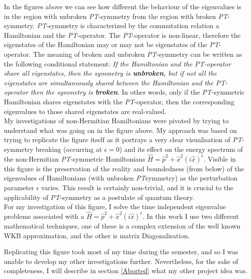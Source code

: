 \documentclass[10pt, a4paper, singlespacing]{report}
\newcommand\PT{\emph{PT}}
\begin{document}
In the figures above we can see how different the behaviour of the eigenvalues is in the region with unbroken \PT-symmetry from the region with broken \PT-symmetry.
\PT-symmetry is characterized by the commutation relation a Hamiltonian and the \PT-operator. The \PT-operator is non-linear, therefore the eigenstates of the Hamiltonian may or may not be eigenstates of the \PT-operator. The meaning of broken and unbroken \PT-symmetry can be written as the following conditional statement: \emph{If the Hamiltonian and the \PT-operator share all eigenstates, then the symmetry is \textbf{unbroken}, but if not all the eigenstates are simultaneously shared between the Hamiltonian and the \PT-operator then the symmetry is \textbf{broken}}\cite{BenderPT}\cite{Bender}. In other words, only if the \PT-symmetric Hamiltonian shares eigenstates with the \PT-operator, then the corresponding eigenvalues to those shared eigenstates are real-valued.\\
My investigations of non-Hermitian Hamiltonians were pivoted by trying to understand what was going on in the figure above. My approach was based on trying to replicate the figure itself as it portrays a very clear visualisation of \PT-symmetry breaking (occurring at $\epsilon = 0$) and its effect on the energy spectrum of the non-Hermitian \PT-symmetric Hamiltonians $\hat{H} = \hat{p}^2 + \hat{x}^2 (i \hat{x})^{\epsilon}$. Visible in this figure is the preservation of the reality and boundedness (from below) of the eigenvalues of Hamiltonians (with unbroken \PT symmetry) as the perturbation parameter $\epsilon$ varies. This result is certainly non-trivial, and it is crucial to the applicability of \PT-symmetry as a postulate of quantum theory.\\

For my investigation of this figure, I solve the time independent eigenvalue problems associated with a $\hat{H} = \hat{p}^2 + \hat{x}^2 (i \hat{x})^{\epsilon}$. In this work I use two different mathematical techniques, one of these is a complex extension of the well known WKB approximation, and the other is matrix Diagonalisation.

Replicating this figure took most of my time during the semester, and so I was unable to develop my other investigations further. Nevertheless, for the sake of completeness, I will describe in section \ref{Aborted} what my other project idea was.

\end{document}
